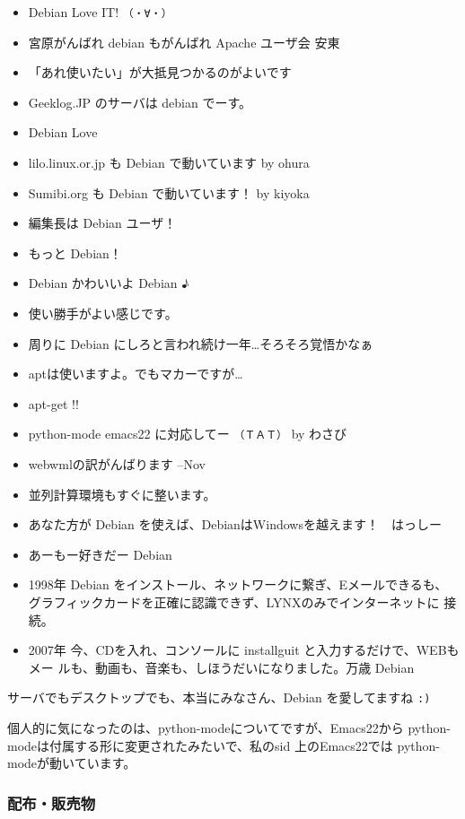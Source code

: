 \documentclass[mingoth,a4paper]{jsarticle}
\begin{document}
\begin{multicols}{2}
 \begin{itemize}
 \item Debian Love IT! \verb|（・∀・）|
 \item 宮原がんばれ debian もがんばれ Apache ユーザ会 安東
 \item 「あれ使いたい」が大抵見つかるのがよいです
 \item Geeklog.JP のサーバは debian でーす。
 \item Debian Love
 \item lilo.linux.or.jp も Debian で動いています by ohura
 \item Sumibi.org も Debian で動いています！ by kiyoka
 \item 編集長は Debian ユーザ！
 \item もっと Debian！
 \item Debian かわいいよ Debian ♪
 \item 使い勝手がよい感じです。
 \item 周りに Debian にしろと言われ続け一年…そろそろ覚悟かなぁ
 \item aptは使いますよ。でもマカーですが…
 \item apt-get !!
 \item python-mode emacs22 に対応してー \verb|（ＴＡＴ）| by わさび
 \item webwmlの訳がんばります --Nov
 \item 並列計算環境もすぐに整います。
 \item あなた方が Debian を使えば、DebianはWindowsを越えます！　はっしー
 \item あーもー好きだー Debian
 \item 1998年 Debian をインストール、ネットワークに繋ぎ、Eメールできるも、
       グラフィックカードを正確に認識できず、LYNXのみでインターネットに
       接続。
 \item 2007年 今、CDを入れ、コンソールに installguit と入力するだけで、WEBもメー
       ルも、動画も、音楽も、しほうだいになりました。万歳 Debian
 \end{itemize}
\end{multicols}

サーバでもデスクトップでも、本当にみなさん、Debian を愛してますね
\verb|:)|

個人的に気になったのは、python-modeについてですが、Emacs22から
python-modeは付属する形に変更されたみたいで、私のsid 上のEmacs22では
python-modeが動いています。

\subsubsection{配布・販売物}
\end{document}
